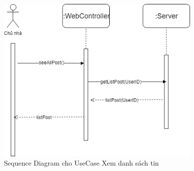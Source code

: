 \begin{figure}[!h]
	\centering
	\includegraphics[width=10cm]{parts/bao/images/SequenceDiagram_ListPost.png}
	\caption{Sequence Diagram cho UseCase Xem danh sách tin}
\end{figure}

